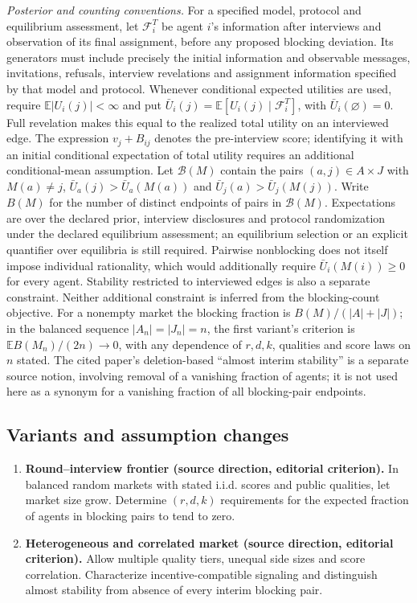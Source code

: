 \documentclass[11pt,a4paper]{article}
\newcommand{\E}{\mathbb E}
\begin{document}
\emph{Posterior and counting conventions.} For a specified model, protocol and equilibrium assessment, let \(\mathcal F_i^T\) be agent \(i\)'s information after interviews and observation of its final assignment, before any proposed blocking deviation. Its generators must include precisely the initial information and observable messages, invitations, refusals, interview revelations and assignment information specified by that model and protocol. Whenever conditional expected utilities are used, require \(\E|U_i(j)|<\infty\) and put \(\bar U_i(j)=\E[U_i(j)\mid\mathcal F_i^T]\), with \(\bar U_i(\varnothing)=0\). Full revelation makes this equal to the realized total utility on an interviewed edge. The expression \(v_j+B_{ij}\) denotes the pre-interview score; identifying it with an initial conditional expectation of total utility requires an additional conditional-mean assumption. Let \(\mathcal B(M)\) contain the pairs \((a,j)\in A\times J\) with \(M(a)\ne j\), \(\bar U_a(j)>\bar U_a(M(a))\) and \(\bar U_j(a)>\bar U_j(M(j))\). Write \(B(M)\) for the number of distinct endpoints of pairs in \(\mathcal B(M)\). Expectations are over the declared prior, interview disclosures and protocol randomization under the declared equilibrium assessment; an equilibrium selection or an explicit quantifier over equilibria is still required. Pairwise nonblocking does not itself impose individual rationality, which would additionally require \(\bar U_i(M(i))\ge0\) for every agent. Stability restricted to interviewed edges is also a separate constraint. Neither additional constraint is inferred from the blocking-count objective. For a nonempty market the blocking fraction is \(B(M)/(|A|+|J|)\); in the balanced sequence \(|A_n|=|J_n|=n\), the first variant's criterion is \(\E B(M_n)/(2n)\to0\), with any dependence of \(r,d,k\), qualities and score laws on \(n\) stated. The cited paper's deletion-based ``almost interim stability'' is a separate source notion, involving removal of a vanishing fraction of agents; it is not used here as a synonym for a vanishing fraction of all blocking-pair endpoints.
\subsection*{Variants and assumption changes}
\begin{enumerate}
\item \textbf{Round--interview frontier (source direction, editorial criterion).} In balanced random markets with stated i.i.d. scores and public qualities, let market size grow. Determine \((r,d,k)\) requirements for the expected fraction of agents in blocking pairs to tend to zero.
\item \textbf{Heterogeneous and correlated market (source direction, editorial criterion).} Allow multiple quality tiers, unequal side sizes and score correlation. Characterize incentive-compatible signaling and distinguish almost stability from absence of every interim blocking pair.
\end{enumerate}
\end{document}
